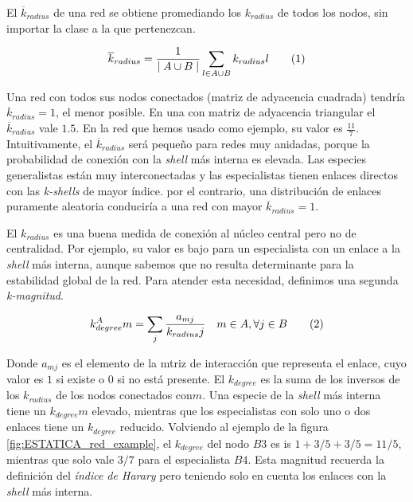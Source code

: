 \begin{theo} 
El \textit{$\overline k_{radius}$} de una red se obtiene promediando los ${k}_{radius}$ de todos los nodos, sin importar la clase a la que pertenezcan.

\begin{align*}
\displaystyle
\overline {k}_{radius} = \frac{1}{\mid A \cup B \mid}\sum\limits_{l \in A \cup B} k_{radius}l
\stepcounter{equation}\tag{\theequation}\label{avgkradius}
\end{align*}
\label{ESTATICA_avgkradius}
\end{theo}

Una red con todos sus nodos conectados (matriz de adyacencia cuadrada) tendría $\overline {k}_{radius}=1$, el menor posible. En una con matriz de adyacencia triangular el $\overline {k}_{radius}$ vale $1.5$. En la red que hemos usado como ejemplo, su valor es $\frac{11}{7}$. Intuitivamente, el $\overline {k}_{radius}$ será pequeño para redes muy anidadas, porque la probabilidad de conexión con la \textit{shell} más interna es elevada. Las especies generalistas están muy interconectadas y las especialistas tienen enlaces directos con las \textit{k-shells} de mayor índice. por el contrario, una distribución de enlaces puramente aleatoria conduciría a una red con mayor $\overline {k}_{radius}=1$.

El ${k}_{radius}$ es una buena medida de conexión al núcleo central pero no de centralidad. Por ejemplo, su valor es bajo para un especialista con un enlace a la \textit{shell} más interna, aunque sabemos que no resulta determinante para la estabilidad global de la red. Para atender esta necesidad, definimos una segunda \textit{k-magnitud}.

\begin{theo} 
\begin{align*}
\displaystyle
k^A_{degree}m = \sum\limits_{j} \frac{a_{mj} }{k_{radius}j}  \quad   m \in A, \forall j \in B
\stepcounter{equation}\tag{\theequation}
\end{align*}
\label{kdegree}
\end{theo}

Donde $a_{mj}$ es el elemento de la mtriz de interacción que representa el enlace, cuyo valor es $1$ si existe o $0$ si no está presente. El $k_{degree}$ es la suma de los inversos de los $k_{radius}$ de los nodos conectados con$m$. Una especie de la \textit{shell} más interna tiene un $k_{degree}m$ elevado,  mientras que los especialistas con solo uno o dos enlaces tiene un $k_{degree}$ reducido. Volviendo al ejemplo de la figura \ref{fig:ESTATICA_red_example}, el $k_{degree}$ del nodo $B3$ es is $1+3/5+3/5 = 11/5$, mientras que solo vale $3/7$ para el especialista $B4$. Esta magnitud recuerda la definición del \textit{índice de Harary} \cite{plavvsic1993harary} pero teniendo solo en cuenta los enlaces con la \textit{shell} más interna.


